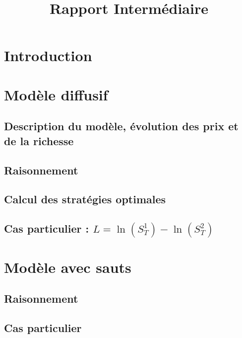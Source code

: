 \documentclass[11pt,letterpaper]{article}
\title{Rapport Intermédiaire}
\begin{document}



\pagebreak
\tableofcontents
\pagebreak

\section{Introduction}



\pagebreak
\section{Modèle diffusif}
%
\subsection{Description du modèle, évolution des prix et de la richesse}

\subsection{Raisonnement}

\subsection{Calcul des stratégies optimales}

\subsection{Cas particulier : $L = \ln \left( S_T^{1} \right) - \ln \left( S_T^{2} \right)$}




\pagebreak
\section{Modèle avec sauts}
\subsection{Raisonnement}

\subsection{Cas particulier}


\pagebreak
\nocite{*}


\end{document}
